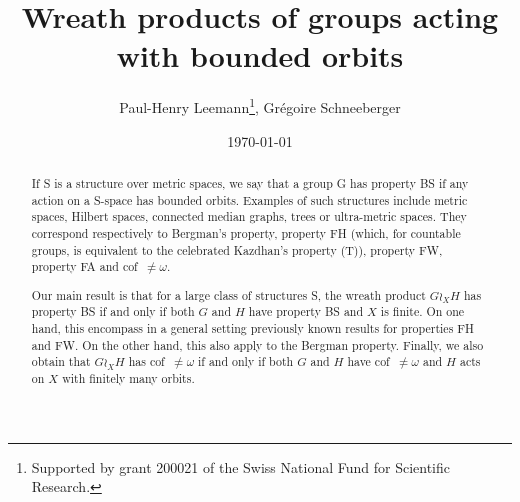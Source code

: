 \documentclass[a4paper]{article}
\title{Wreath products of groups acting with bounded orbits}
\author{Paul-Henry Leemann\thanks{Supported by grant 200021\textunderscore188578 of the Swiss National Fund for Scientific Research.}, Grégoire Schneeberger}
\date{\today \quad \currenttime}
\theoremstyle{definition}
\begin{document}
\maketitle
%
%
%
%
%
%
%
%
%
%
\begin{abstract}
If S is a structure over metric spaces, we say that a group G has property BS if any action on a S-space has bounded orbits. Examples of such structures include metric spaces, Hilbert spaces, connected median graphs, trees or ultra-metric spaces.
They correspond respectively to Bergman's property, property FH (which, for countable groups, is equivalent to the celebrated Kazdhan's property (T)), property FW, property FA and cof~$\neq\omega$.

Our main result is that for a large class of structures S, the wreath product $G\wr_XH$ has property BS if and only if both $G$ and $H$ have property BS and $X$ is finite. On one hand, this encompass in a general setting previously known results for properties FH and FW. On the other hand, this also apply to the Bergman property.
Finally, we also obtain that $G\wr_XH$ has cof~$\neq\omega$ if and only if both $G$ and $H$ have cof~$\neq\omega$ and $H$ acts on $X$ with finitely many orbits.
\end{abstract}
%
%
%
%
%
%
%
%
%
%
%
%
%
%
%
%
%
%
%
%
%
%
%
%
%
\end{document}

